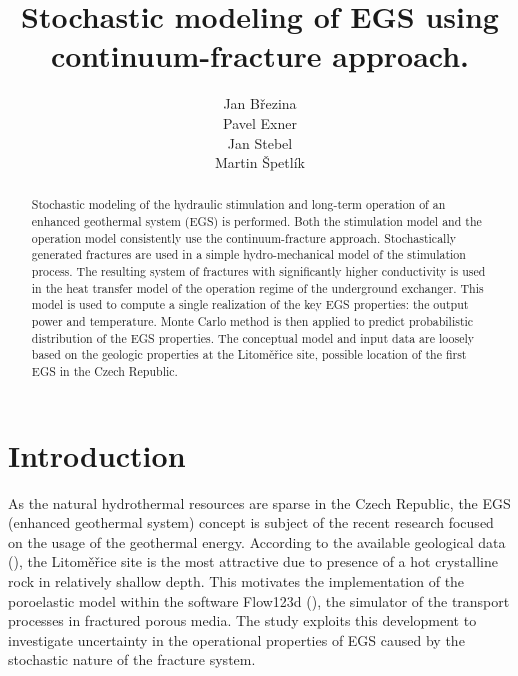 \documentclass{article}
\title{Stochastic modeling of EGS using continuum-fracture approach.}
\author{
  Jan B{\v r}ezina \\
  \And
  Pavel Exner \\
  \And
  Jan Stebel \\
  \And
  Martin {\v S}petl{\' i}k \\
}
\begin{document}
\maketitle

\begin{abstract}
Stochastic modeling of the hydraulic stimulation and long-term operation of an enhanced geothermal system (EGS) is performed.
Both the stimulation model and the operation model consistently use the continuum-fracture approach. Stochastically generated
fractures are used in a simple hydro-mechanical model of the stimulation process. The resulting system of fractures with significantly
higher conductivity is used in the heat transfer model of the operation regime of the underground exchanger. This model is used to
compute a single realization of the key EGS properties: the output power and temperature. Monte Carlo method is then applied to
predict probabilistic distribution of the EGS properties. The conceptual model and input data are loosely based on the geologic
properties at the Litom{\v e}{\v r}ice site, possible location of the first EGS in the Czech Republic.
\end{abstract}




\section{Introduction}
As the natural hydrothermal resources are sparse in the Czech Republic, the EGS (enhanced geothermal system) concept is subject
of the recent research focused on the usage of the geothermal energy. According to the available geological data (\cite{Capova2013}), the
Litom{\v e}{\v r}ice site is the most attractive due to presence of a hot crystalline rock in relatively shallow depth. This motivates the
implementation of the poroelastic model within the software Flow123d (\cite{flow123d}), the simulator
of the transport processes in fractured porous media. The study exploits this development to investigate uncertainty in the operational
properties of EGS caused by the stochastic nature of the fracture system.
\end{document}
